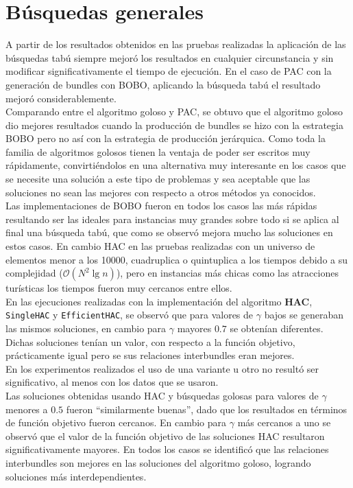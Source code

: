 \section{Búsquedas generales}
A partir de los resultados obtenidos en las pruebas realizadas la aplicación de las búsquedas tabú siempre mejoró los resultados en cualquier circunstancia y sin modificar significativamente el tiempo de ejecución. En el caso de PAC con la generación de bundles con BOBO, aplicando la búsqueda tabú el resultado mejoró considerablemente.\\
Comparando entre el algoritmo goloso y PAC, se obtuvo que el algoritmo goloso dio mejores resultados cuando la producción de bundles se hizo con la estrategia BOBO pero no así con la estrategia de producción jerárquica. Como toda la familia de algoritmos golosos tienen la ventaja de poder ser escritos muy rápidamente, convirtiéndolos en una alternativa muy interesante en los casos que se necesite una solución a este tipo de problemas y sea aceptable que las soluciones no sean las mejores con respecto a otros métodos ya conocidos.\\
Las implementaciones de BOBO fueron en todos los casos las más rápidas resultando ser las ideales para instancias muy grandes sobre todo si se aplica al final una búsqueda tabú, que como se observó mejora mucho las soluciones en estos casos. En cambio HAC en las pruebas realizadas con un universo de elementos menor a los 10000, cuadruplica o quintuplica a los tiempos debido a su complejidad ($\mathcal{O}(N^{2}\lg n)$), pero en instancias más chicas como las atracciones turísticas los tiempos fueron muy cercanos entre ellos.\\
En las ejecuciones realizadas con la implementación del algoritmo \textbf{HAC}, \texttt{SingleHAC} y \texttt{EfficientHAC}, se observó que para valores de $\gamma$ bajos se generaban las mismos soluciones, en cambio para $\gamma$ mayores $0.7$ se obtenían diferentes. Dichas soluciones tenían un valor, con respecto a la función objetivo, prácticamente igual pero se sus relaciones interbundles eran mejores.\\
En los experimentos realizados el uso de una variante u otro no resultó ser significativo, al menos con los datos que se usaron.\\
Las soluciones obtenidas usando HAC y búsquedas golosas para valores de $\gamma$ menores a $0.5$ fueron \textquotedblleft similarmente buenas\textquotedblright , dado que los resultados en términos de función objetivo fueron cercanos. En cambio para $\gamma$ más cercanos a uno se observó que el valor de la función objetivo de las soluciones HAC resultaron significativamente mayores. En todos los casos se identificó que las relaciones interbundles son mejores en las soluciones del algoritmo goloso, logrando soluciones más interdependientes.

